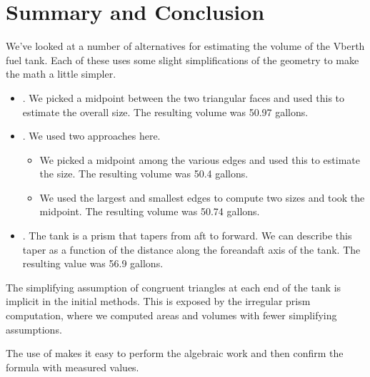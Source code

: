 \documentclass[letterpaper,10pt,english]{sphinxmanual}
\begin{document}
\section{Summary and Conclusion}
\label{\detokenize{conclusion:summary-and-conclusion}}\label{\detokenize{conclusion::doc}}
\sphinxAtStartPar
We’ve looked at a number of alternatives for estimating the volume of the V\sphinxhyphen{}berth fuel tank.
Each of these uses some slight simplifications of the geometry to make the math a little simpler.
\begin{itemize}
\item {} 
\sphinxAtStartPar
{}. We picked a mid\sphinxhyphen{}point between the two triangular faces and used this to estimate the overall size. The resulting volume was 50.97 gallons.

\item {} 
\sphinxAtStartPar
{}. We used two approaches here.
\begin{itemize}
\item {} 
\sphinxAtStartPar
We picked a mid\sphinxhyphen{}point among the various edges and used this to estimate the size. The resulting volume was 50.4 gallons.

\item {} 
\sphinxAtStartPar
We used the largest and smallest edges to compute two sizes and took the mid\sphinxhyphen{}point. The resulting volume was 50.74 gallons.

\end{itemize}

\item {} 
\sphinxAtStartPar
{}. The tank is a prism that tapers from aft to forward. We can describe this taper as a function of the distance along the fore\sphinxhyphen{}and\sphinxhyphen{}aft axis of the tank. The  resulting value was 56.9 gallons.

\end{itemize}

\sphinxAtStartPar
The simplifying assumption of congruent triangles at each end of the tank is implicit in the initial methods. This is exposed by the irregular prism computation, where we computed areas and volumes with fewer simplifying assumptions.

\sphinxAtStartPar
The use of  makes it easy to perform the algebraic work and then confirm the formula with measured values.







\renewcommand{\indexname}{Index}
\printindex
\end{document}
